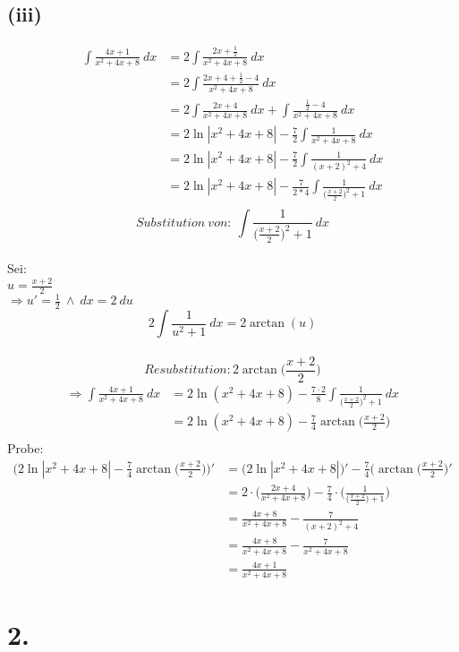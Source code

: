 \documentclass[a4paper]{scrartcl}
\begin{document}
\subsection{(iii)}
\begin{align}
\int \frac{4x+1}{x^2+4x+8}\ dx&=2\int \frac{2x+\frac{1}{2}}{x^2+4x+8}\ dx\\
 &=2\int \frac{2x+4+\frac{1}{2}-4}{x^2+4x+8}\ dx\\
 &=2\int \frac{2x+4}{x^2+4x+8}\ dx+\int \frac{\frac{1}{2}-4}{x^2+4x+8}\ dx\\
 &=2\ln |x^2+4x+8| -\frac{7}{2}\int \frac{1}{x^2+4x+8}\ dx\\
 &=2\ln |x^2+4x+8| -\frac{7}{2}\int \frac{1}{(x+2)^2+4}\ dx\\
 &=2\ln |x^2+4x+8| -\frac{7}{2*4}\int \frac{1}{\Big(\frac{x+2}{2}\Big)^2+1}\ dx\\
\end{align}
\newpage
\[Substitution\ von:\ \int \frac{1}{\Big(\frac{x+2}{2}\Big)^2+1}\ dx\]\\
Sei:\\
\(u=\frac{x+2}{2}\)\\ 
\(\Rightarrow u'=\frac{1}{2}\ \land\ dx=2\ du\)\\
\[2\int \frac{1}{u^2+1}\ dx =2\arctan(u)\]\\
\[Resubstitution: 2\arctan \Big(\frac{x+2}{2}\Big)\]
\begin{align}
\Rightarrow \int \frac{4x+1}{x^2+4x+8}\ dx&=2\ln(x^2+4x+8) -\frac{7\cdot 2}{8}\int\frac{1}{\Big(\frac{x+2}{2}\Big)^2+1}\ dx\\
	&=2\ln(x^2+4x+8) -\frac{7}{4}\arctan \Big(\frac{x+2}{2}\Big)\\
\end{align}
Probe:\\
\begin{align}
\Big(2\ln |x^2+4x+8| -\frac{7}{4}\arctan\Big(\frac{x+2}{2}\Big)\Big)'&=\Big(2\ln |x^2+4x+8|\Big)'-\frac{7}{4}\Big(\arctan\Big(\frac{x+2}{2}\Big)'\\
	&=2\cdot\bigg(\frac{2x+4}{x^2+4x+8}\bigg) - \frac{7}{4}\cdot\Bigg(\frac{1}{\Big(\frac{x+2}{2}\Big)+1}\Bigg)\\
	&=\frac{4x+8}{x^2+4x+8}-\frac{7}{(x+2)^2+4}\\
	&=\frac{4x+8}{x^2+4x+8}-\frac{7}{x^2+4x+8}\\
	&=\frac{4x+1}{x^2+4x+8}
\end{align}

\section{2.}
\end{document}
